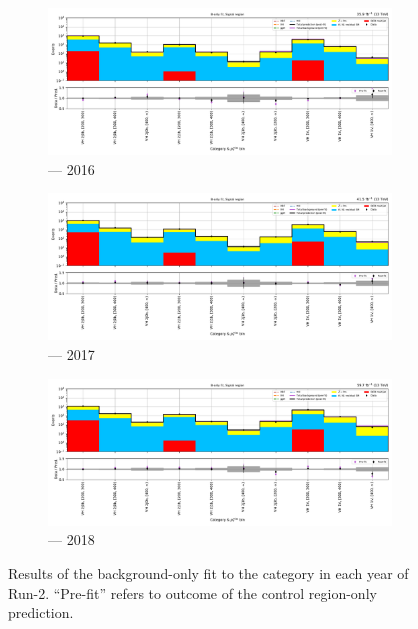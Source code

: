 \begin{figure}[htbp]
    \centering
    \begin{subfigure}[b]{0.9\textwidth}
        \includegraphics[width=\textwidth]{chapters/higgstoinv/figures/mountain_ranges/2016/VH/SR_tree_fit_b-abs_values_VH_cats.pdf}
        \caption{\VH --- 2016}
    \end{subfigure}

    \begin{subfigure}[b]{0.9\textwidth}
        \includegraphics[width=\textwidth]{chapters/higgstoinv/figures/mountain_ranges/2017/VH/SR_tree_fit_b-abs_values_VH_cats.pdf}
        \caption{\VH --- 2017}
    \end{subfigure}

    \begin{subfigure}[b]{0.9\textwidth}
        \includegraphics[width=\textwidth]{chapters/higgstoinv/figures/mountain_ranges/2018/VH/SR_tree_fit_b-abs_values_VH_cats.pdf}
        \caption{\VH --- 2018}
    \end{subfigure}
    \caption[Results of the background-only fit to the \VH category in each year of Run-2]{Results of the background-only fit to the \VH category in each year of Run-2. ``Pre-fit'' refers to outcome of the control region-only prediction.}
    \label{fig:htoinv_mountain_range_B_only_VH_SR}
\end{figure}


